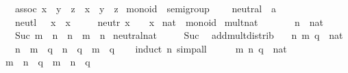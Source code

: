 \begin{isabellebody}
\ \ \ assoc{\isacharcolon}\ {\isachardoublequoteopen}{\isacharparenleft}x\ {\isasymotimes}\ y{\isacharparenright}\ {\isasymotimes}\ z\ {\isacharequal}\ x\ {\isasymotimes}\ {\isacharparenleft}y\ {\isasymotimes}\ z{\isacharparenright}{\isachardoublequoteclose}\isanewline
\isanewline
{}\isamarkupfalse%
\ monoid\ {\isacharequal}\ semigroup\ {\isacharplus}\isanewline
\ \ \ neutral\ {\isacharcolon}{\isacharcolon}\ {\isacharprime}a\ {\isacharparenleft}{\isachardoublequoteopen}{\isasymone}{\isachardoublequoteclose}{\isacharparenright}\isanewline
\ \ \ neutl{\isacharcolon}\ {\isachardoublequoteopen}{\isasymone}\ {\isasymotimes}\ x\ {\isacharequal}\ x{\isachardoublequoteclose}\isanewline
\ \ \ \ \ neutr{\isacharcolon}\ {\isachardoublequoteopen}x\ {\isasymotimes}\ {\isasymone}\ {\isacharequal}\ x{\isachardoublequoteclose}\isanewline
\isanewline
{}\isamarkupfalse%
\ nat\ {\isacharcolon}{\isacharcolon}\ monoid\isanewline
{}\isanewline
\isanewline
{}\isamarkupfalse%
\ mult{\isacharunderscore}nat\ \isanewline
\ \ \ \ {\isachardoublequoteopen}{}\ {\isasymotimes}\ n\ {\isacharequal}\ {\isacharparenleft}{}{\isasymColon}nat{\isacharparenright}{\isachardoublequoteclose}\isanewline
\ \ {\isacharbar}\ {\isachardoublequoteopen}Suc\ m\ {\isasymotimes}\ n\ {\isacharequal}\ n\ {\isacharplus}\ m\ {\isasymotimes}\ n{\isachardoublequoteclose}\isanewline
\isanewline
{}\isamarkupfalse%
\ neutral{\isacharunderscore}nat\ \isanewline
\ \ {\isachardoublequoteopen}{\isasymone}\ {\isacharequal}\ Suc\ {}{\isachardoublequoteclose}\isanewline
\isanewline
{}\isamarkupfalse%
\ add{\isacharunderscore}mult{\isacharunderscore}distrib{\isacharcolon}\isanewline
\ \ \ n\ m\ q\ {\isacharcolon}{\isacharcolon}\ nat\isanewline
\ \ \ {\isachardoublequoteopen}{\isacharparenleft}n\ {\isacharplus}\ m{\isacharparenright}\ {\isasymotimes}\ q\ {\isacharequal}\ n\ {\isasymotimes}\ q\ {\isacharplus}\ m\ {\isasymotimes}\ q{\isachardoublequoteclose}\isanewline
\ \ \isamarkupfalse%
\ {\isacharparenleft}induct\ n{\isacharparenright}\ simp{\isacharunderscore}all\isanewline
\isanewline
{}\isamarkupfalse%
\ \isamarkupfalse%
\isanewline
\ \ \isamarkupfalse%
\ m\ n\ q\ {\isacharcolon}{\isacharcolon}\ nat\isanewline
\ \ \isamarkupfalse%
\ {\isachardoublequoteopen}m\ {\isasymotimes}\ n\ {\isasymotimes}\ q\ {\isacharequal}\ m\ {\isasymotimes}\ {\isacharparenleft}n\ {\isasymotimes}\ q{\isacharparenright}{\isachardoublequoteclose}\isanewline

\end{isabellebody}
